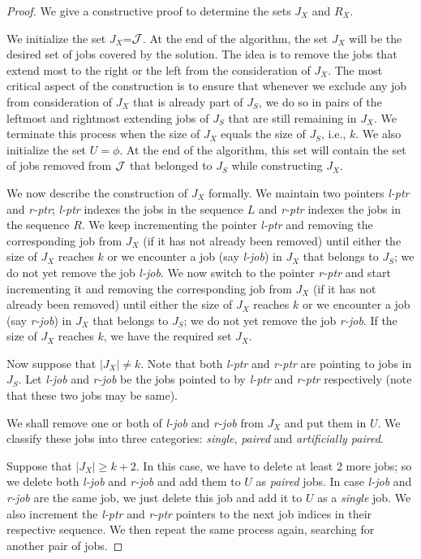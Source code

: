 \documentclass[11pt]{article}
\newtheorem{proof}[theorem]{Proof}
\newcommand{\J}{{\cal J}}
\newcommand{\lptr}{{\em l-ptr}}
\newcommand{\rptr}{{\em r-ptr}}
\newcommand{\ljob}{{\em l-job}}
\newcommand{\rjob}{{\em r-job}}
\begin{document}
\begin{proof}
We give a constructive proof to determine the sets $J_X$ and $R_X$.


We initialize the set $J_X$=${\cal J}$. At the end of the algorithm, 
the set $J_X$ will be the desired set of jobs covered by the solution.
The idea is to remove the jobs that extend most to the right or the left from the consideration of $J_X$.
The most critical aspect of the construction is to ensure that whenever we exclude any job from consideration
of $J_X$ that is already part of $J_S$, we do so in pairs of the leftmost and rightmost extending jobs of $J_S$
that are still remaining in $J_X$. 
We terminate this process when the size of $J_X$ equals the size of $J_S$, i.e., $k$.
We also initialize the set $U=\phi$. 
At the end of the algorithm, this set will contain the set of jobs removed from ${\J}$ that belonged to $J_S$
while constructing $J_X$.

We now describe the construction of $J_X$ formally.
We maintain two pointers {\lptr} and {\rptr}; {\lptr} indexes the jobs in the sequence $L$ 
and {\rptr} indexes the jobs in the sequence $R$.
We keep incrementing the pointer {\lptr} and removing the corresponding job from $J_X$ 
(if it has not already been removed) until either the size of $J_X$ reaches $k$ 
or we encounter a job (say {\ljob}) in $J_X$ that belongs to $J_S$;  we do not yet remove the job {\ljob}.
We now switch to the pointer {\rptr} and start incrementing it and removing the corresponding job from $J_X$ 
(if it has not already been removed) until either the size of $J_X$ reaches $k$ 
or we encounter a job (say {\rjob}) in $J_X$ that belongs to $J_S$;  we do not yet remove the job {\rjob}.
If the size of $J_X$ reaches $k$, we have the required set $J_X$. 

Now suppose that $|J_X| \ne k$.
Note that both {\lptr} and {\rptr} are pointing to jobs in $J_S$.
Let {\ljob} and {\rjob} be the jobs pointed to by {\lptr} and {\rptr} respectively (note that 
these two jobs may be same).

We shall remove one or both of {\ljob} and {\rjob} from $J_X$ and put them in $U$. 
We classify these jobs into three categories: {\em single}, {\em paired} and {\em artificially paired}.

Suppose that $|J_X| \ge k+2$.
In this case, we have to delete at least 2 more jobs; so we delete both {\ljob} and {\rjob} and add them to $U$
as {\em paired} jobs.
In case {\ljob} and {\rjob} are the same job, we just delete this job and add it to $U$ as a {\em single} job.
We also increment the {\lptr} and {\rptr} pointers to the next job indices in their respective sequence.
We then repeat the same process again, searching for another pair of jobs.


\end{proof}
\end{document}
